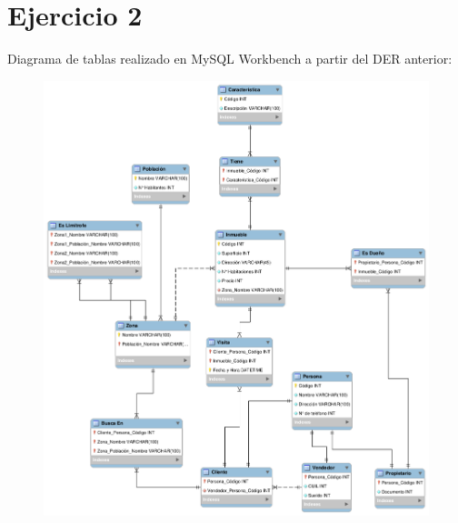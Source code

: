 \documentclass[11pt, fleqn]{article}
\begin{document}
\section*{Ejercicio 2}

Diagrama de tablas realizado en MySQL Workbench a partir del DER anterior:

\begin{figure}[h!]
      \begin{center}
          \includegraphics[width=0.95\linewidth]{diagramaTablas.png}
      \end{center}
\end{figure}
\end{document}
